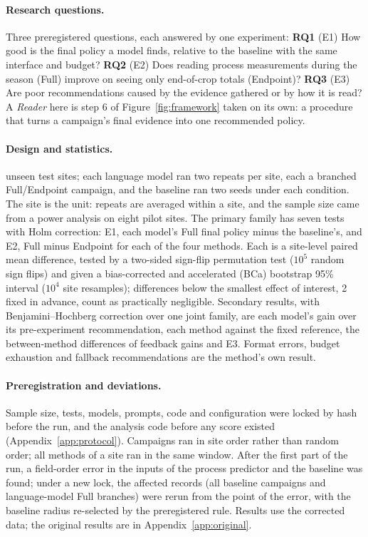 \paragraph{Research questions.} Three preregistered questions, each answered by one experiment:
\textbf{RQ1} (E1) How good is the final policy a model finds, relative to the baseline with the same interface and budget?
\textbf{RQ2} (E2) Does reading process measurements during the season (Full) improve on seeing only end-of-crop totals (Endpoint)?
\textbf{RQ3} (E3) Are poor recommendations caused by the evidence gathered or by how it is read? A \emph{Reader} here is step 6 of Figure~\ref{fig:framework} taken on its own: a procedure that turns a campaign's final evidence into one recommended policy.

\paragraph{Design and statistics.}  unseen test sites; each language model ran two repeats per site, each a branched Full/Endpoint campaign, and the baseline ran two seeds under each condition. The site is the unit: repeats are averaged within a site, and the sample size came from a power analysis on eight pilot sites. The primary family has seven tests with Holm correction: E1, each model's Full final policy minus the baseline's, and E2, Full minus Endpoint for each of the four methods. Each is a site-level paired mean difference, tested by a two-sided sign-flip permutation test ($10^5$ random sign flips) and given a bias-corrected and accelerated (BCa) bootstrap 95\% interval ($10^4$ site resamples); differences below the smallest effect of interest, 2~\eur{} fixed in advance, count as practically negligible. Secondary results, with Benjamini--Hochberg correction over one joint family, are each model's gain over its pre-experiment recommendation, each method against the fixed reference, the between-method differences of feedback gains and E3. Format errors, budget exhaustion and fallback recommendations are the method's own result.

\paragraph{Preregistration and deviations.} Sample size, tests, models, prompts, code and configuration were locked by hash before the run, and the analysis code before any score existed (Appendix~\ref{app:protocol}). Campaigns ran in site order rather than random order; all methods of a site ran in the same window. After the first part of the run, a field-order error in the inputs of the process predictor and the baseline was found; under a new lock, the affected records (all baseline campaigns and  language-model Full branches) were rerun from the point of the error, with the baseline radius re-selected by the preregistered rule. Results use the corrected data; the original results are in Appendix~\ref{app:original}.
